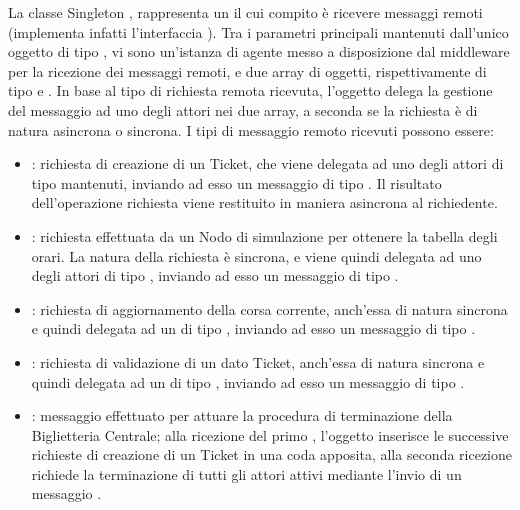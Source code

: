 	La classe Singleton , rappresenta un  il cui compito è ricevere messaggi remoti (implementa infatti l'interfaccia ). Tra i parametri principali mantenuti dall'unico oggetto di tipo , vi sono un'istanza di agente messo a disposizione dal middleware  per la ricezione dei messaggi remoti, e due array di oggetti, rispettivamente di tipo  e . 
	In base al tipo di richiesta remota ricevuta, l'oggetto  delega la gestione del messaggio ad uno degli attori nei due array, a seconda se la richiesta è di natura asincrona o sincrona. I tipi di messaggio remoto ricevuti possono essere:
	\begin{itemize}
		\item {}: richiesta di creazione di un Ticket, che viene delegata ad uno degli attori di tipo  mantenuti, inviando ad esso un messaggio di tipo . Il risultato dell'operazione richiesta viene restituito in maniera asincrona al richiedente.
		\item {}: richiesta effettuata da un Nodo di simulazione per ottenere la tabella degli orari. La natura della richiesta è sincrona, e viene quindi delegata ad uno degli attori di tipo , inviando ad esso un messaggio di tipo .
		
		\item {}: richiesta di aggiornamento della corsa corrente, anch'essa di natura sincrona e quindi delegata ad un  di tipo , inviando ad esso un messaggio di tipo .
		
		\item {}: richiesta di validazione di un dato Ticket, anch'essa di natura sincrona e quindi delegata ad un   di tipo , inviando ad esso un messaggio di tipo .
		
		\item {}: messaggio effettuato per attuare la procedura di terminazione della Biglietteria Centrale; alla ricezione del primo , l'oggetto  inserisce le successive richieste di creazione di un Ticket in una coda apposita, alla seconda ricezione richiede la terminazione di tutti gli attori attivi mediante l'invio di un messaggio .		
		
	\end{itemize}
	
